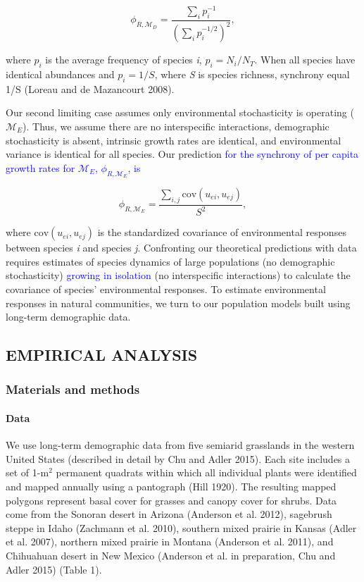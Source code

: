 \documentclass[12pt,]{article}
\begin{document}
\begin{equation}
\phi_{R,\mathcal{M}_{D}} = \frac{\sum_i p_i^{-1}}{\left(\sum_i p_i^{-1/2} \right)^2},
\end{equation}

\noindent where \(p_i\) is the average frequency of species \emph{i},
\(p_i = N_i/N_T\). When all species have identical abundances and
\(p_i = 1/S\), where \emph{S} is species richness, synchrony equal 1/S
(Loreau and {{de Mazancourt}} 2008).

Our second limiting case assumes only environmental stochasticity is
operating (\(\mathcal{M}_{E}\)). Thus, we assume there are no
interspecific interactions, demographic stochasticity is absent,
intrinsic growth rates are identical, and environmental variance is
identical for all species. Our prediction
\textcolor{blue}{for the synchrony of per capita growth rates for $\mathcal{M}_{E}$, $\phi_{R,\mathcal{M}_{E}}$, is }

\begin{equation}
\phi_{R,\mathcal{M}_{E}} = \frac{\sum_{i,j}\text{cov}(u_{ei},u_{ej})}{S^2},
\end{equation}

\noindent{} where \(\text{cov}(u_{ei},u_{ej})\) is the standardized
covariance of environmental responses between species \emph{i} and
species \emph{j}. Confronting our theoretical predictions with data
requires estimates of species dynamics of large populations (no
demographic stochasticity) \textcolor{blue}{growing in isolation} (no
interspecific interactions) to calculate the covariance of species'
environmental responses. To estimate environmental responses in natural
communities, we turn to our population models built using long-term
demographic data.

\subsection{EMPIRICAL ANALYSIS}\label{empirical-analysis}

\subsubsection{Materials and methods}\label{materials-and-methods}

\paragraph{Data}\label{data}

We use long-term demographic data from five semiarid grasslands in the
western United States (described in detail by Chu and Adler 2015). Each
site includes a set of 1-\(\text{m}^2\) permanent quadrats within which
all individual plants were identified and mapped annually using a
pantograph (Hill 1920). The resulting mapped polygons represent basal
cover for grasses and canopy cover for shrubs. Data come from the
Sonoran desert in Arizona (Anderson et al. 2012), sagebrush steppe in
Idaho (Zachmann et al. 2010), southern mixed prairie in Kansas (Adler et
al. 2007), northern mixed prairie in Montana (Anderson et al. 2011), and
Chihuahuan desert in New Mexico (Anderson et al. in preparation, Chu and
Adler 2015) (Table 1).
\end{document}
